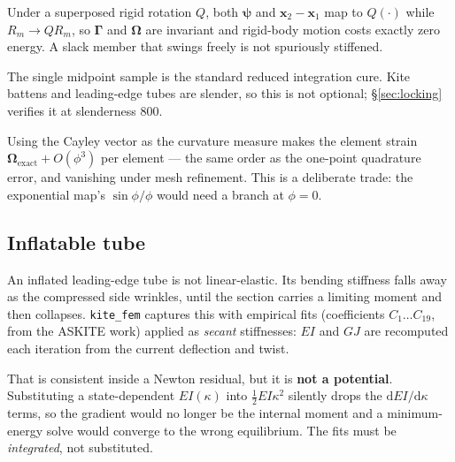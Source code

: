 \documentclass[11pt,a4paper]{article}
\newcommand{\code}[1]{\texttt{\small #1}}
\begin{document}
\begin{description}[style=unboxed,leftmargin=1.2em]
\item[Objective.] Under a superposed rigid rotation $Q$, both $\boldsymbol{\psi}$
and $\mathbf{x}_2-\mathbf{x}_1$ map to $Q(\cdot)$ while $R_m \to QR_m$, so
$\boldsymbol{\Gamma}$ and $\boldsymbol{\Omega}$ are invariant and rigid-body
motion costs exactly zero energy. A slack member that swings freely is not
spuriously stiffened.
\item[Shear-locking free.] The single midpoint sample is the standard reduced
integration cure. Kite battens and leading-edge tubes are slender, so this is
not optional; \S\ref{sec:locking} verifies it at slenderness 800.
\item[Branch-free.] Using the Cayley vector as the curvature measure makes the
element strain $\boldsymbol{\Omega}_{\text{exact}} + O(\phi^3)$ per element ---
the same order as the one-point quadrature error, and vanishing under mesh
refinement. This is a deliberate trade: the exponential map's $\sin\phi/\phi$
would need a branch at $\phi=0$.
\end{description}

\subsection{Inflatable tube}
\label{sec:inflatable}

An inflated leading-edge tube is not linear-elastic. Its bending stiffness falls
away as the compressed side wrinkles, until the section carries a limiting
moment and then collapses. \code{kite\_fem} captures this with empirical fits
(coefficients $C_1 \ldots C_{19}$, from the ASKITE work) applied as \emph{secant}
stiffnesses: $EI$ and $GJ$ are recomputed each iteration from the current
deflection and twist.

That is consistent inside a Newton residual, but it is \textbf{not a potential}.
Substituting a state-dependent $EI(\kappa)$ into $\tfrac{1}{2}EI\kappa^2$
silently drops the $\mathrm{d}EI/\mathrm{d}\kappa$ terms, so the gradient would
no longer be the internal moment and a minimum-energy solve would converge to
the wrong equilibrium. The fits must be \emph{integrated}, not substituted.
\end{document}
